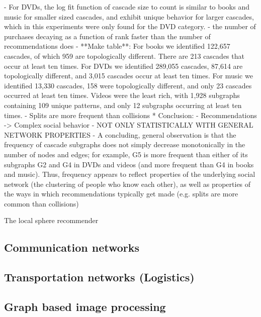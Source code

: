 	- For DVDs, the log fit function of cascade size to count is similar to books and music for smaller sized cascades, and exhibit unique behavior for larger cascades, which in this experiments were only found for the DVD category.
	- the number of purchases decaying as a function of rank faster than the number of recommendations does
	- **Make table**: For books we identified 122,657 cascades, of which 959 are topologically different. There are 213 cascades that occur at least ten times. For DVDs we identified 289,055 cascades, 87,614 are topologically different, and 3,015 cascades occur at least ten times. For music we identified 13,330 cascades, 158 were topologically different, and only 23 cascades occurred at least ten times. Videos were the least rich, with 1,928 subgraphs containing 109 unique patterns, and only 12 subgraphs occurring at least ten times.
	- Splits are more frequent than collisions
	* Conclusion:
	- Recommendations -> Complex social behavior
	- NOT ONLY STATISTICALLY WITH GENERAL NETWORK PROPERTIES
	- A concluding, general observation is that the frequency of cascade subgraphs does not simply decrease monotonically in the number of nodes and edges; for example, G5 is more frequent than either of its subgraphs G2 and G4 in DVDs and videos (and more frequent than G4 in books and music). Thus, frequency appears to reflect properties of the underlying social network (the clustering of people who know each other), as well as properties of the ways in which recommendations typically get made (e.g. splits are more common than collisions)
	
	The local sphere recommender
	
	\subsection{Communication networks}
	\label{ssect:app_communication_networks}
	
	\subsection{Transportation networks (Logistics)}
	\label{ssect:app_transportation_networks}
	
	\subsection{Graph based image processing}
	\label{ssect:app_graph_img_proc}
	
